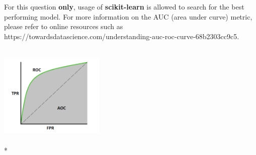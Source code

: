 \documentclass[letterpaper]{article}
\begin{document}
\begin{enumerate}
For this question \textbf{only}, usage of \textbf{scikit-learn} is allowed to search for the best performing model. For more information 
on the AUC (area under curve) metric, please refer to online resources such as https://towardsdatascience.com/understanding-auc-roc-curve-68b2303cc9c5. 
\begin{center}
\includegraphics[width=5cm,height=5cm,keepaspectratio]{auc.png} \\*
\end{center}
\end{enumerate}
\end{document}
